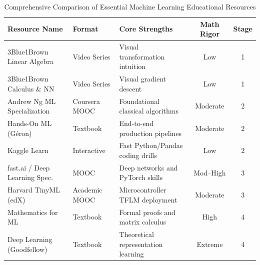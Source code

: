 \begin{table}[htbp]
\centering
\small
\caption{Comprehensive Comparison of Essential Machine Learning Educational Resources}\label{tab:resources_summary}
\begin{tabular}{@{}p{3.2cm}p{2.2cm}p{3.0cm}cc@{}}
\toprule
\textbf{Resource Name} & \textbf{Format} & \textbf{Core Strengths} & \textbf{Math Rigor} & \textbf{Stage} \\ \midrule
3Blue1Brown Linear Algebra & Video Series & Visual transformation intuition & Low & 1 \\ \addlinespace
3Blue1Brown Calculus \& NN & Video Series & Visual gradient descent & Low & 1 \\ \addlinespace
Andrew Ng ML Specialization & Coursera MOOC & Foundational classical algorithms & Moderate & 2 \\ \addlinespace
Hands-On ML (Géron) & Textbook & End-to-end production pipelines & Moderate & 2 \\ \addlinespace
Kaggle Learn & Interactive & Fast Python/Pandas coding drills & Low & 2 \\ \addlinespace
fast.ai / Deep Learning Spec. & MOOC & Deep networks and PyTorch skills & Mod--High & 3 \\ \addlinespace
Harvard TinyML (edX) & Academic MOOC & Microcontroller TFLM deployment & Moderate & 3 \\ \addlinespace
Mathematics for ML & Textbook & Formal proofs and matrix calculus & High & 4 \\ \addlinespace
Deep Learning (Goodfellow) & Textbook & Theoretical representation learning & Extreme & 4 \\ \bottomrule
\end{tabular}
\end{table}

